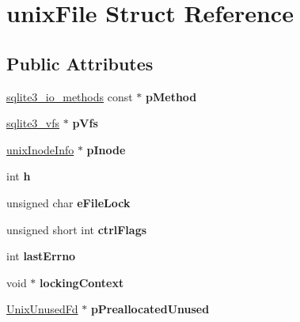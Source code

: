 \hypertarget{structunix_file}{}\section{unix\+File Struct Reference}
\label{structunix_file}
\subsection*{Public Attributes}
\begin{DoxyCompactItemize}
\item 
\mbox{\label{structunix_file_a2a2b40e965f91aa9ee21135bfb0c17ec}} 
\mbox{\hyperlink{structsqlite3__io__methods}{sqlite3\+\_\+io\+\_\+methods}} const  $\ast$ {\bfseries p\+Method}
\item 
\mbox{\label{structunix_file_a048d696479bb2544ab2cec1ac9a75d67}} 
\mbox{\hyperlink{structsqlite3__vfs}{sqlite3\+\_\+vfs}} $\ast$ {\bfseries p\+Vfs}
\item 
\mbox{\label{structunix_file_ac17292fe29bb6cc9eceed9db6d1209e8}} 
\mbox{\hyperlink{structunix_inode_info}{unix\+Inode\+Info}} $\ast$ {\bfseries p\+Inode}
\item 
\mbox{\label{structunix_file_a1c58798d4ff3ac6232765c8b76bb7450}} 
int {\bfseries h}
\item 
\mbox{\label{structunix_file_a001e59bdb9d3f396952c2c8e3229f7fc}} 
unsigned char {\bfseries e\+File\+Lock}
\item 
\mbox{\label{structunix_file_a05d9d0af8aa4d9de6a250984cc12ae56}} 
unsigned short int {\bfseries ctrl\+Flags}
\item 
\mbox{\label{structunix_file_afde57c2e118fac8041918dac2ee6f7d1}} 
int {\bfseries last\+Errno}
\item 
\mbox{\label{structunix_file_afaeb4425a6de3e913db4b03e8a0d098a}} 
void $\ast$ {\bfseries locking\+Context}
\item 
\mbox{\label{structunix_file_ab30f660bed6da02a9c438ba6aa7260c9}} 
\mbox{\hyperlink{struct_unix_unused_fd}{Unix\+Unused\+Fd}} $\ast$ {\bfseries p\+Preallocated\+Unused}

\end{DoxyCompactItemize}
